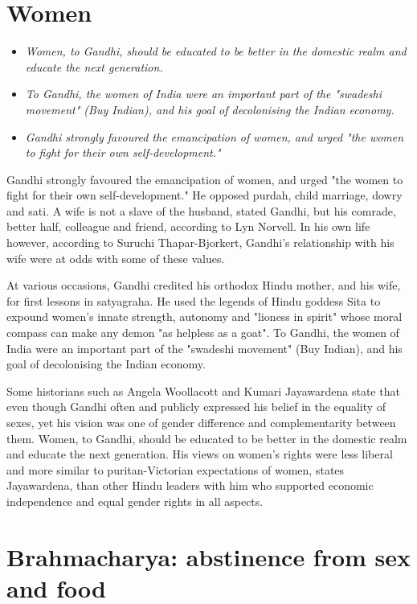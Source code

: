 \section{Women}\label{women}

\begin{itemize}
\item
  \emph{Women, to Gandhi, should be educated to be better in the
  domestic realm and educate the next generation.}
\item
  \emph{To Gandhi, the women of India were an important part of the
  "swadeshi movement" (Buy Indian), and his goal of decolonising the
  Indian economy.}
\item
  \emph{Gandhi strongly favoured the emancipation of women, and urged
  "the women to fight for their own self-development."}
\end{itemize}

Gandhi strongly favoured the emancipation of women, and urged "the women
to fight for their own self-development." He opposed purdah, child
marriage, dowry and sati. A wife is not a slave of the husband, stated
Gandhi, but his comrade, better half, colleague and friend, according to
Lyn Norvell. In his own life however, according to Suruchi
Thapar-Bjorkert, Gandhi's relationship with his wife were at odds with
some of these values.

At various occasions, Gandhi credited his orthodox Hindu mother, and his
wife, for first lessons in satyagraha. He used the legends of Hindu
goddess Sita to expound women's innate strength, autonomy and "lioness
in spirit" whose moral compass can make any demon "as helpless as a
goat". To Gandhi, the women of India were an important part of the
"swadeshi movement" (Buy Indian), and his goal of decolonising the
Indian economy.

Some historians such as Angela Woollacott and Kumari Jayawardena state
that even though Gandhi often and publicly expressed his belief in the
equality of sexes, yet his vision was one of gender difference and
complementarity between them. Women, to Gandhi, should be educated to be
better in the domestic realm and educate the next generation. His views
on women's rights were less liberal and more similar to
puritan-Victorian expectations of women, states Jayawardena, than other
Hindu leaders with him who supported economic independence and equal
gender rights in all aspects.

\section{Brahmacharya: abstinence from sex and
food}\label{brahmacharya-abstinence-from-sex-and-food}

